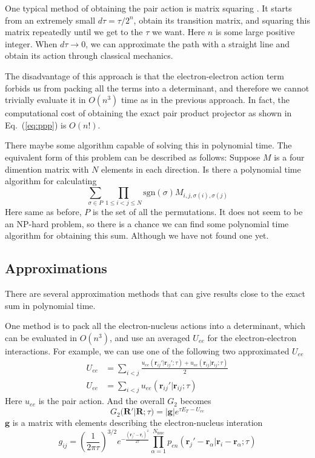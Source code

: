 \documentclass[%
reprint,
nofootinbib,
amsmath,amssymb,
aps,
prl,
]{revtex4-1}
\begin{document}
One typical method of obtaining the pair action is matrix squaring \cite{pollock1987path}.
It starts from an extremely small $d\tau = \tau/2^n$, obtain its transition matrix, and squaring this matrix repeatedly until we get to the $\tau$ we want.
Here $n$ is some large positive integer.
When $d\tau \to 0$, we can approximate the path with a straight line and obtain its action through classical mechanics.

The disadvantage of this approach is that the electron-electron action term forbids us from packing all the terms into a determinant, and therefore we cannot trivially evaluate it in $O(n^3)$ time as in the previous approach.
In fact, the computational cost of obtaining the exact pair product projector as shown in Eq.~(\ref{eq:ppp}) is $O(n!)$.

There maybe some algorithm capable of solving this in polynomial time.
The equivalent form of this problem can be described as follows:
Suppose $M$ is a four dimention matrix with $N$ elements in each direction.
Is there a polynomial time algorithm for calculating
\begin{equation}
\label{eq:algo}
\sum\limits_{\sigma \in P}\prod\limits_{1\leq i < j \leq N}\mathrm{sgn}(\sigma)M_{i,j,\sigma(i),\sigma(j)}
\end{equation}
Here same as before, $P$ is the set of all the permutations.
It does not seem to be an NP-hard problem, so there is a chance we can find some polynomial time algorithm for obtaining this sum.
Although we have not found one yet.

\subsection{Approximations}

There are several approximation methods that can give results close to the exact sum in polynomial time.

One method is to pack all the electron-nucleus actions into a determinant, which can be evaluated in $O(n^3)$, and use an averaged $U_{ee}$ for the electron-electron interactions.
For example, we can use one of the following two approximated $U_{ee}$ \cite{umrigar2015observations}
\begin{align}
U_{ee} & = \sum\limits_{i<j}
\frac{u_{ee}(\bm{r}_{ij}'|\bm{r}_{ij}';\tau) + u_{ee}(\bm{r}_{ij}|\bm{r}_{ij};\tau)}{2}\\
U_{ee} & = \sum\limits_{i<j}u_{ee}(\bm{r}_{ij}'|\bm{r}_{ij};\tau)
\end{align}
Here $u_{ee}$ is the pair action.
And the overall $G_2$ becomes
\begin{equation}
\label{eq:G2pppUee}
G_2(\bm{R'}|\bm{R};\tau) = |\bm{g}|e^{\tau E_T-U_{ee}}
\end{equation}
$\bm{g}$ is a matrix with elements describing the electron-nucleus interation
\begin{equation}
g_{ij} = \left(\frac{1}{2\pi\tau}\right)^{3/2}e^{-\frac{(\bm{r}_j'-\bm{r}_i)^2}{2\tau}} \prod\limits_{\alpha = 1}^{N_{\mathrm{nuc}}}
p_{en}(\bm{r}_j'-\bm{r}_\alpha|\bm{r}_i-\bm{r}_\alpha;\tau)
\end{equation}
\end{document}

